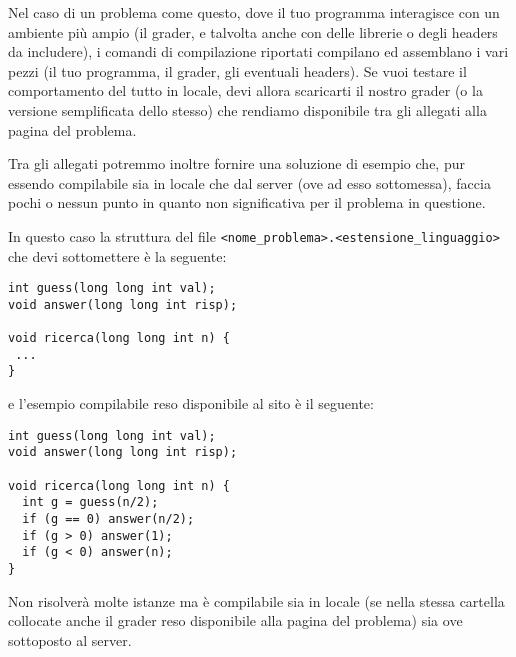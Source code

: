 \documentclass[a4paper,11pt]{article}
\begin{document}
  Nel caso di un problema come questo, dove il tuo programma interagisce
  con un ambiente pi\`u ampio (il grader, e talvolta anche con delle librerie o degli headers da includere), i comandi di compilazione riportati compilano ed assemblano i vari pezzi (il tuo programma, il grader, gli eventuali headers).
  Se vuoi testare il comportamento del tutto in locale,
  devi allora scaricarti il nostro grader (o la versione semplificata dello stesso) che rendiamo disponibile tra gli allegati alla pagina del problema.

  Tra gli allegati potremmo inoltre fornire una soluzione di esempio che,
  pur essendo compilabile sia in locale che dal server (ove ad esso sottomessa),
  faccia pochi o nessun punto in quanto non significativa per il problema
  in questione.

  In questo caso la struttura del file \texttt{<nome\_problema>.<estensione\_linguaggio>} che devi sottomettere \`e la seguente:

\begin{verbatim}
int guess(long long int val);
void answer(long long int risp);

void ricerca(long long int n) {
 ...
}
\end{verbatim}
  
e l'esempio compilabile reso disponibile al sito \`e il seguente:
\begin{verbatim}
int guess(long long int val);
void answer(long long int risp);

void ricerca(long long int n) {
  int g = guess(n/2);
  if (g == 0) answer(n/2);
  if (g > 0) answer(1);
  if (g < 0) answer(n);
}
\end{verbatim}

Non risolver\`a molte istanze ma \`e compilabile sia in locale (se nella stessa cartella collocate anche il grader reso disponibile alla pagina del problema) sia ove sottoposto al server.
  
\end{document}
